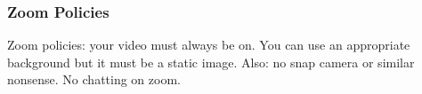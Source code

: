 \subsubsection*{Zoom Policies}

Zoom policies: your video must always be on. You can use an appropriate background but it must be a static image. Also: no snap camera or similar nonsense. No chatting on zoom.